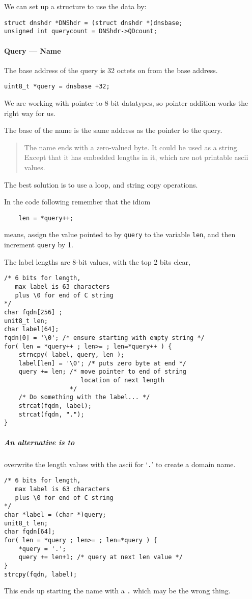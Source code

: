 \documentclass{article}
\begin{document}
We can set up a structure to use the data by:
\begin{verbatim}
struct dnshdr *DNShdr = (struct dnshdr *)dnsbase;
unsigned int querycount = DNShdr->QDcount;
\end{verbatim}

\paragraph{Query --- Name}
The base address of the query is 32 octets on from the base address.
\begin{verbatim}
uint8_t *query = dnsbase +32;
\end{verbatim}
We are working with pointer to 8-bit datatypes, so pointer addition works the
right way for us.

The base of the name is the same address as the pointer to the query.

\begin{quote}
	The name ends with a zero-valued byte.  It could be used as a string.
	Except that it has embedded lengths in it, which are not printable ascii
	values.
\end{quote}

The best solution is to use a loop, and string copy operations.

In the code following remember that the idiom
\begin{verbatim}
    len = *query++;
\end{verbatim}
means, assign the value pointed to by \texttt{query} to the variable
\texttt{len}, and then increment \texttt{query} by 1.

The label lengths are 8-bit values, with the top 2 bits clear, 
\begin{verbatim}
/* 6 bits for length,
   max label is 63 characters
   plus \0 for end of C string
*/
char fqdn[256] ;
unit8_t len;
char label[64];
fqdn[0] = '\0'; /* ensure starting with empty string */
for( len = *query++ ; len>= ; len=*query++ ) {
    strncpy( label, query, len );
    label[len] = '\0'; /* puts zero byte at end */
    query += len; /* move pointer to end of string
                     location of next length 
                  */
	/* Do something with the label... */
	strcat(fqdn, label);
	strcat(fqdn, ".");
}
\end{verbatim}

\subparagraph{An alternative is to } overwrite the length values with the
ascii for `\texttt{.}' to create a domain name.
\begin{verbatim}
/* 6 bits for length,
   max label is 63 characters
   plus \0 for end of C string
*/
char *label = (char *)query;
unit8_t len;
char fqdn[64]; 
for( len = *query ; len>= ; len=*query ) {
	*query = '.';
	query += len+1; /* query at next len value */
}
strcpy(fqdn, label);
\end{verbatim}
This ends up starting the name with a \texttt{.} which may be the wrong thing.




\end{document}
